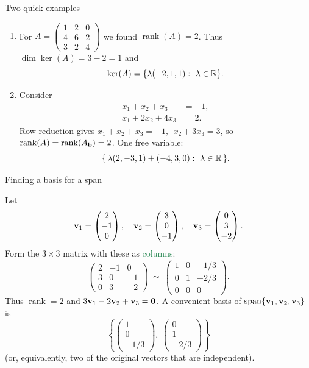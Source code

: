\documentclass[11pt,aspectratio=169]{beamer}
\DeclareMathOperator{\rank}{rank}
\begin{document}
\begin{frame}{Two quick examples}
 
\begin{enumerate}
\item For
\(
A=\begin{pmatrix}
1&2&0\\
4&6&2\\
3&2&4
\end{pmatrix}
\)
we found $\rank(A)=2$. Thus $\dim\ker(A)=3-2=1$ and
\[
\ker(A)=\{\lambda(-2,1,1):\ \lambda\in\R\}.
\]
\item Consider
\[
\begin{aligned}
x_1+x_2+x_3&=-1,\\
x_1+2x_2+4x_3&=2.
\end{aligned}
\]
Row reduction gives
\(
x_1+x_2+x_3=-1,\ \ x_2+3x_3=3
\),
so $\rank(A)=\rank(A_{\bf b})=2$. One free variable:
\[
\{\,\lambda(2,-3,1)+(-4,3,0):\ \lambda\in\R\,\}.
\]
\end{enumerate}
 
\end{frame}

\begin{frame}{Finding a basis for a span}
 
Let
\[
{\bf v}_1=\begin{pmatrix}2\\-1\\0\end{pmatrix},\quad
{\bf v}_2=\begin{pmatrix}3\\0\\-1\end{pmatrix},\quad
{\bf v}_3=\begin{pmatrix}0\\3\\-2\end{pmatrix}.
\]
Form the $3\times 3$ matrix with these as \textcolor{SeaGreen}{columns}:
\[
\begin{pmatrix}
2&-1&0\\
3&0&-1\\
0&3&-2
\end{pmatrix}\ \sim\
\begin{pmatrix}
1&0&-1/3\\
0&1&-2/3\\
0&0&0
\end{pmatrix}.
\]
Thus $\rank=2$ and $3{\bf v}_1-2{\bf v}_2+{\bf v}_3={\bf 0}$. A convenient basis of $\mathrm{span}\{{\bf v}_1,{\bf v}_2,{\bf v}_3\}$ is
\[
\left\{\begin{pmatrix}1\\0\\-1/3\end{pmatrix},\ \begin{pmatrix}0\\1\\-2/3\end{pmatrix}\right\}
\]
(or, equivalently, two of the original vectors that are independent).
 
\end{frame}
\end{document}
